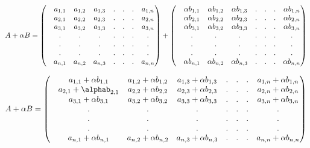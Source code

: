 \documentclass[45pt]{article}
\begin{document}
\begin{enumerate}
    $
        A+ \alpha B =\begin{pmatrix}
            & a_{1,1} & a_{1,2} & a_{1,3} &.&.&.& a_{1,n}  \\
            & a_{2,1} & a_{2,2} & a_{2,3} &.&.&.& a_{2,n}  \\
            & a_{3,1} & a_{3,2} & a_{3,3} &.&.&.& a_{3,n}  \\
            & . & . & . &.&.&.&.\\
            & . & . & . &.&.&.&.\\
            & . & . & . &.&.&.&.\\
            & a_{n,1} & a_{n,2} & a_{n,3} &.&.&.& a_{n,n}  \\
            \end{pmatrix} + \begin{pmatrix}
        & \alpha b_{1,1} & \alpha b_{1,2} & \alpha b_{1,3} &.&.&.& \alpha b_{1,n}  \\
        & \alpha b_{2,1} & \alpha b_{2,2} & \alpha b_{2,3} &.&.&.& \alpha b_{2,n}  \\
        & \alpha b_{3,1} & \alpha b_{3,2} & \alpha b_{3,3} &.&.&.& \alpha b_{3,n}  \\
        & . & . & . &.&.&.&.\\
        & . & . & . &.&.&.&.\\
        & . & . & . &.&.&.&.\\
        & \alpha b_{n,1} & \alpha b_{n,2} & \alpha b_{n,3} &.&.&.& \alpha b_{n,n}  \\
        \end{pmatrix}\\\\
    $

$  A+ \alpha B =
    \begin{pmatrix}
        
        & a_{1,1} +\alpha b_{1,1} & a_{1,2} + \alpha b_{1,2} & a_{1,3} + \alpha b_{1,3}  &.&.&.& a_{1,n} +\alpha b_{1,n}  \\
        & a_{2,1}  + \alphab_{2,1} & a_{2,2} + \alpha b_{2,2} & a_{2,3} + \alpha b_{2,3}  &.&.&.& a_{2,n} +\alpha b_{2,n}  \\
        & a_{3,1} + \alpha b_{3,1} & a_{3,2} + \alpha b_{3,2} & a_{3,3} + \alpha b_{3,3}  &.&.&.& a_{3,n} +\alpha b_{3,n}  \\
        & . & . & . &.&.&.&.\\
        & . & . & . &.&.&.&.\\
        & . & . & . &.&.&.&.\\
        & a_{n,1}+\alpha b_{n,1} & a_{n,2} + \alpha b_{n,2} & a_{n,3}+\alpha b_{n,3} &.&.&.& a_{n,n}+\alpha b_{n,n}  \\
    \end{pmatrix}\\\\$


\end{enumerate}
\end{document}
